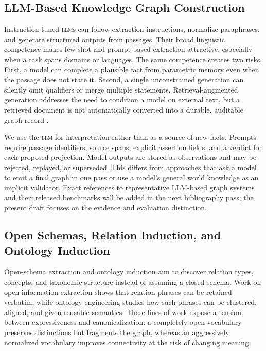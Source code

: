 \documentclass[11pt]{article}
\newcommand{\llm}{\textsc{llm}}
\newcommand{\llms}{\textsc{llm}s}
\begin{document}
\subsection{LLM-Based Knowledge Graph Construction}
\label{sec:llmkg}

Instruction-tuned \llms{} can follow extraction instructions, normalize paraphrases, and generate structured outputs from passages. Their broad linguistic competence makes few-shot and prompt-based extraction attractive, especially when a task spans domains or languages. The same competence creates two risks. First, a model can complete a plausible fact from parametric memory even when the passage does not state it. Second, a single unconstrained generation can silently omit qualifiers or merge multiple statements. Retrieval-augmented generation addresses the need to condition a model on external text, but a retrieved document is not automatically converted into a durable, auditable graph record \citep{lewis2020}.

We use the \llm{} for interpretation rather than as a source of new facts. Prompts require passage identifiers, source spans, explicit assertion fields, and a verdict for each proposed projection. Model outputs are stored as observations and may be rejected, replayed, or superseded. This differs from approaches that ask a model to emit a final graph in one pass or use a model's general world knowledge as an implicit validator. Exact references to representative LLM-based graph systems and their released benchmarks will be added in the next bibliography pass; the present draft focuses on the evidence and evaluation distinction.

\subsection{Open Schemas, Relation Induction, and Ontology Induction}
\label{sec:open-schema}

Open-schema extraction and ontology induction aim to discover relation types, concepts, and taxonomic structure instead of assuming a closed schema. Work on open information extraction shows that relation phrases can be retained verbatim, while ontology engineering studies how such phrases can be clustered, aligned, and given reusable semantics. These lines of work expose a tension between expressiveness and canonicalization: a completely open vocabulary preserves distinctions but fragments the graph, whereas an aggressively normalized vocabulary improves connectivity at the risk of changing meaning.
\end{document}
